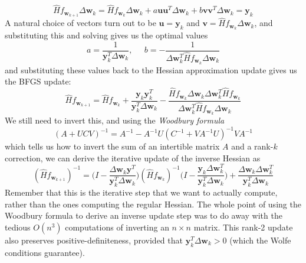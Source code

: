   \begin{equation}
    \hat{H} f_{\mathbf{w}_{k+1}} \Delta \mathbf{w}_k = \hat{H} f_{\mathbf{w}_{k}} \Delta \mathbf{w}_k + a \mathbf{u} \mathbf{u}^T \Delta \mathbf{w}_k + b \mathbf{v} \mathbf{v}^T \Delta \mathbf{w}_k = \mathbf{y}_k
  \end{equation}
  A natural choice of vectors turn out to be $\mathbf{u} = \mathbf{y}_k$ and $\mathbf{v} = \hat{H} f_{\mathbf{w}_{k}} \Delta \mathbf{w}_k$, and substituting this and solving gives us the optimal values 
  \begin{equation}
    a = \frac{1}{\mathbf{y}_k^T \Delta \mathbf{w}_k}, \;\;\;\;\; b = -\frac{1}{\Delta \mathbf{w}_k^T \hat{H} f_{\mathbf{w}_{k}} \Delta \mathbf{w}_k}
  \end{equation}
  and substituting these values back to the Hessian approximation update gives us the BFGS update: 
  \begin{equation}
    \hat{H} f_{\mathbf{w}_{k+1}} = \hat{H} f_{\mathbf{w}_{k}} + \frac{\mathbf{y}_k \mathbf{y}_k^T}{\mathbf{y}_k^T \Delta \mathbf{w}_k} - \frac{\hat{H} f_{\mathbf{w}_{k}} \Delta \mathbf{w}_k \Delta \mathbf{w}_k^T \hat{H} f_{\mathbf{w}_{k}}}{\Delta \mathbf{w}_k^T \hat{H} f_{\mathbf{w}_{k}} \Delta \mathbf{w}_k}
  \end{equation}
  We still need to invert this, and using the \textit{Woodbury formula}
  \begin{equation}
    (A + U C V)^{-1} = A^{-1} - A^{-1} U (C^{-1} + V A^{-1} U)^{-1} V A^{-1}
  \end{equation}
  which tells us how to invert the sum of an intertible matrix $A$ and a rank-$k$ correction, we can derive the iterative update of the inverse Hessian as 
  \begin{equation}
    (\hat{H} f_{\mathbf{w}_{k+1}})^{-1} = \bigg( I - \frac{\Delta \mathbf{w}_k \mathbf{y}^T}{\mathbf{y}_k^T \Delta \mathbf{w}_k}\bigg) (\hat{H} f_{\mathbf{w}_{k}})^{-1} \bigg( I - \frac{\mathbf{y}_k \Delta \mathbf{w}_k^T}{\mathbf{y}_k^T \Delta \mathbf{w}_k}\bigg) + \frac{\Delta \mathbf{w}_k \Delta \mathbf{w}_k^T}{\mathbf{y}_k^T \Delta \mathbf{w}_k}
  \end{equation}
  Remember that this is the iterative step that we want to actually compute, rather than the ones computing the regular Hessian. The whole point of using the Woodbury formula to derive an inverse update step was to do away with the tedious $O(n^3)$ computations of inverting an $n \times n$ matrix. This rank-2 update also preserves positive-definiteness, provided that $\mathbf{y}_k^T \Delta \mathbf{w}_k > 0$ (which the Wolfe conditions guarantee). 


